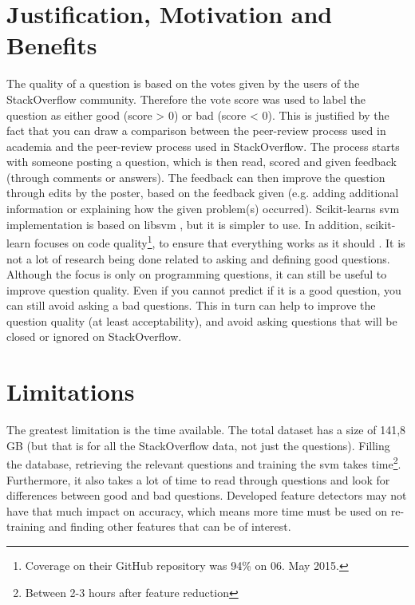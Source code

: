 \begin{comment}
write something about how dataset was processed, e.g. started with N features, then n, then M, etc.
Originally, I used a dataset that was downloaded in August 2015, but found that this was to outdated.
\end{comment}

\section{Justification, Motivation and Benefits}
\label{sec:justification}
The quality of a question is based on the votes given by the users of the StackOverflow community. Therefore the 
vote score was used 
 to label the question as either good (score > 0) or bad (score < 0). This is justified by the fact that 
 you can draw a comparison between the peer-review process used in academia and the peer-review process used 
 in StackOverflow. The process starts with someone posting a question, which is then read, scored and given 
 feedback (through comments or answers). The feedback can then improve the question through edits by the poster, 
 based on the feedback given 
 (e.g. adding additional information or explaining how the given problem(s) occurred).
\vspace{0.5em}\newline
Scikit-learns \gls{svm} implementation is based on libsvm \cite{ChangLin2011}, but it is simpler to use. 
In addition, scikit-learn focuses on code quality\footnote{Coverage on their GitHub repository was 94\% on 
	06. May 2015.}, to ensure that everything works as it should \cite[p.~3]{PedregosaVaroquauxGramfortEtAl2011}.
\vspace{0.5em}\newline
It is not a lot of research being done related to asking and defining good questions. Although the focus is only 
on programming questions, it can still be useful to improve question quality. Even if you cannot predict if it is 
a good question, you can still avoid asking a bad questions. This in turn can help to
improve the question quality (at least acceptability), and avoid asking questions that will be closed or ignored on 
StackOverflow.

\section{Limitations}
\label{sec:limitations}
The greatest limitation is the time available. The total dataset has a size of 141,8 GB (but that is for all the 
 StackOverflow data, not just the questions). Filling the database, retrieving the relevant questions and 
 training the \gls{svm} takes time\footnote{Between 2-3 hours after feature reduction}. Furthermore, it also 
 takes a lot of time to read through questions and look for differences between good and bad questions. 
Developed feature detectors may not have that much impact on accuracy, which means more time must be used on 
re-training and finding other features that can be of interest.
 

